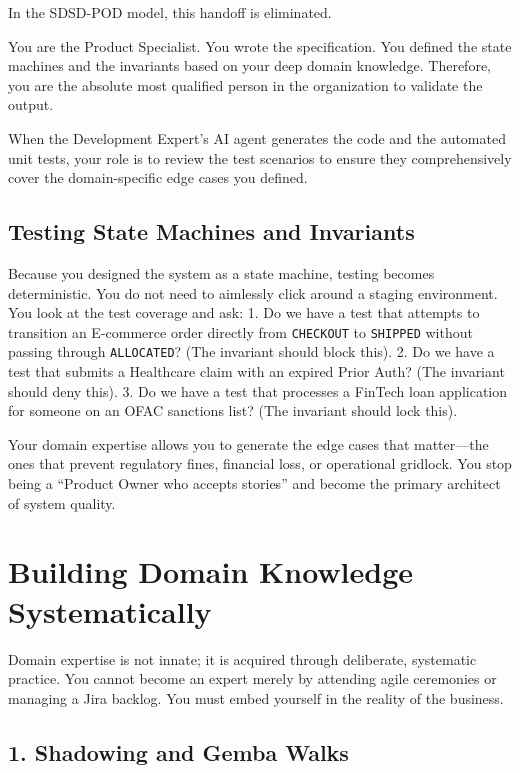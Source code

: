 In the SDSD-POD model, this handoff is eliminated.

You are the Product Specialist. You wrote the specification. You defined
the state machines and the invariants based on your deep domain
knowledge. Therefore, you are the absolute most qualified person in the
organization to validate the output.

When the Development Expert's AI agent generates the code and the
automated unit tests, your role is to review the test scenarios to
ensure they comprehensively cover the domain-specific edge cases you
defined.

\subsection{Testing State Machines and
Invariants}\label{testing-state-machines-and-invariants}

Because you designed the system as a state machine, testing becomes
deterministic. You do not need to aimlessly click around a staging
environment. You look at the test coverage and ask: 1. Do we have a test
that attempts to transition an E-commerce order directly from
\texttt{CHECKOUT} to \texttt{SHIPPED} without passing through
\texttt{ALLOCATED}? (The invariant should block this). 2. Do we have a
test that submits a Healthcare claim with an expired Prior Auth? (The
invariant should deny this). 3. Do we have a test that processes a
FinTech loan application for someone on an OFAC sanctions list? (The
invariant should lock this).

Your domain expertise allows you to generate the edge cases that
matter---the ones that prevent regulatory fines, financial loss, or
operational gridlock. You stop being a ``Product Owner who accepts
stories'' and become the primary architect of system quality.

\bigskip

\section{Building Domain Knowledge
Systematically}\label{building-domain-knowledge-systematically}

Domain expertise is not innate; it is acquired through deliberate,
systematic practice. You cannot become an expert merely by attending
agile ceremonies or managing a Jira backlog. You must embed yourself in
the reality of the business.

\subsection{1. Shadowing and Gemba
Walks}\label{shadowing-and-gemba-walks}

